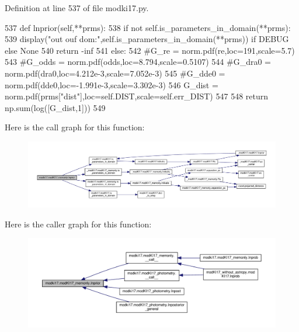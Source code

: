 Definition at line 537 of file modki17.\+py.


\begin{DoxyCode}
537     \textcolor{keyword}{def }lnprior(self,**prms):
538         \textcolor{keywordflow}{if} \textcolor{keywordflow}{not} self.is\_parameters\_in\_domain(**prms):
539             display(\textcolor{stringliteral}{"out ouf dom:"},self.is\_parameters\_in\_domain(**prms)) \textcolor{keywordflow}{if} DEBUG \textcolor{keywordflow}{else} \textcolor{keywordtype}{None}
540             \textcolor{keywordflow}{return} -inf
541         \textcolor{keywordflow}{else}:
542             \textcolor{comment}{#G\_re = norm.pdf(re,loc=191,scale=5.7)}
543             \textcolor{comment}{#G\_odds = norm.pdf(odds,loc=8.794,scale=0.5107)}
544             \textcolor{comment}{#G\_dra0 = norm.pdf(dra0,loc=4.212e-3,scale=7.052e-3)}
545             \textcolor{comment}{#G\_dde0 = norm.pdf(dde0,loc=-1.991e-3,scale=3.302e-3)}
546             G\_dist = norm.pdf(prms[\textcolor{stringliteral}{"dist"}],loc=self.DIST,scale=self.err\_DIST)
547         
548             \textcolor{keywordflow}{return} np.sum(log([G\_dist,1]))
549 
\end{DoxyCode}
Here is the call graph for this function\+:\nopagebreak
\begin{figure}[H]
\begin{center}
\leavevmode
\includegraphics[width=350pt]{df/da2/classmodki17_1_1modKI17__memonly_abb74996f02269af842ee9a12f8054635_cgraph}
\end{center}
\end{figure}
Here is the caller graph for this function\+:\nopagebreak
\begin{figure}[H]
\begin{center}
\leavevmode
\includegraphics[width=350pt]{df/da2/classmodki17_1_1modKI17__memonly_abb74996f02269af842ee9a12f8054635_icgraph}
\end{center}
\end{figure}
\mbox{\label{classmodki17_1_1modKI17__memonly_a5eb9873dae68be85438e7014425d69a0}} 
